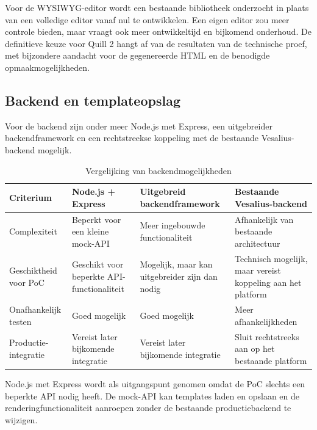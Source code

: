 Voor de WYSIWYG-editor wordt een bestaande bibliotheek onderzocht in plaats
van een volledige editor vanaf nul te ontwikkelen. Een eigen editor zou
meer controle bieden, maar vraagt ook meer ontwikkeltijd en bijkomend
onderhoud. De definitieve keuze voor Quill 2 hangt af van de resultaten van
de technische proef, met bijzondere aandacht voor de gegenereerde HTML en
de benodigde opmaakmogelijkheden.

\subsection{Backend en templateopslag}
Voor de backend zijn onder meer Node.js met Express, een uitgebreider
backendframework en een rechtstreekse koppeling met de bestaande
Vesalius-backend mogelijk.

\begin{table}[htbp]
    \centering
    \caption{Vergelijking van backendmogelijkheden}
    \label{tab:backend-vergelijking}
    \small
    \begin{tabular}{p{3.2cm}p{3.5cm}p{3.5cm}p{3.5cm}}
        \toprule
        \textbf{Criterium} &
        \textbf{Node.js + Express} &
        \textbf{Uitgebreid backendframework} &
        \textbf{Bestaande Vesalius-backend} \\
        \midrule
        Complexiteit &
        Beperkt voor een kleine mock-API &
        Meer ingebouwde functionaliteit &
        Afhankelijk van bestaande architectuur \\
        \addlinespace
        Geschiktheid voor PoC &
        Geschikt voor beperkte API-functionaliteit &
        Mogelijk, maar kan uitgebreider zijn dan nodig &
        Technisch mogelijk, maar vereist koppeling aan het platform \\
        \addlinespace
        Onafhankelijk testen &
        Goed mogelijk &
        Goed mogelijk &
        Meer afhankelijkheden \\
        \addlinespace
        Productie-integratie &
        Vereist later bijkomende integratie &
        Vereist later bijkomende integratie &
        Sluit rechtstreeks aan op het bestaande platform \\
        \bottomrule
    \end{tabular}
\end{table}

Node.js met Express wordt als uitgangspunt genomen omdat de PoC slechts een
beperkte API nodig heeft. De mock-API kan templates laden en opslaan en de
renderingfunctionaliteit aanroepen zonder de bestaande productiebackend
te wijzigen.

